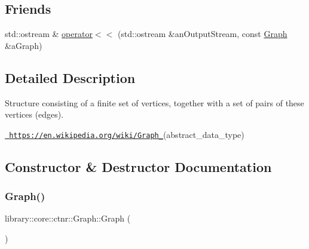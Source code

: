 \subsection*{Friends}
\begin{DoxyCompactItemize}
\item 
std\+::ostream \& \mbox{\hyperlink{classlibrary_1_1core_1_1ctnr_1_1_graph_a225f9b61ac2385ccf05891298c7ab6b1}{operator$<$$<$}} (std\+::ostream \&an\+Output\+Stream, const \mbox{\hyperlink{classlibrary_1_1core_1_1ctnr_1_1_graph}{Graph}} \&a\+Graph)
\end{DoxyCompactItemize}


\subsection{Detailed Description}
Structure consisting of a finite set of vertices, together with a set of pairs of these vertices (edges). 

\href{https://en.wikipedia.org/wiki/Graph_}{\texttt{ https\+://en.\+wikipedia.\+org/wiki/\+Graph\+\_\+}}(abstract\+\_\+data\+\_\+type) 

\subsection{Constructor \& Destructor Documentation}
\mbox{\label{classlibrary_1_1core_1_1ctnr_1_1_graph_accc4cdce1c3ac23e00d70522857f051d}} 
\subsubsection{\texorpdfstring{Graph()}{Graph()}\hspace{0.1cm}{\footnotesize\ttfamily [1/2]}}
{\footnotesize\ttfamily library\+::core\+::ctnr\+::\+Graph\+::\+Graph (\begin{DoxyParamCaption}{ }\end{DoxyParamCaption})\hspace{0.3cm}{\ttfamily [delete]}}

\mbox{\label{classlibrary_1_1core_1_1ctnr_1_1_graph_aed97aab348693c80c4cd7b4a3cf3c1ba}} 
